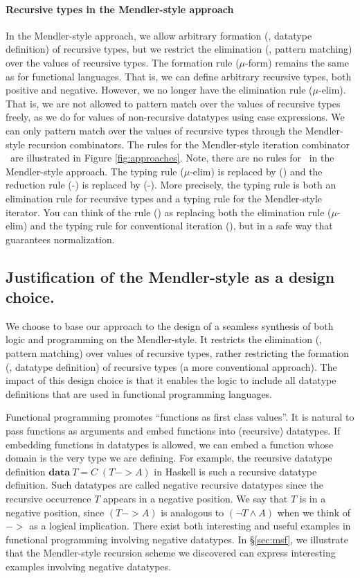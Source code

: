\paragraph{Recursive types in the Mendler-style approach}
In the Mendler-style approach, we allow arbitrary formation
(\ie, datatype definition) of recursive types, but we restrict
the elimination (\ie, pattern matching) over the values of recursive types. 
The formation rule {\small($\mu$-form)} remains the same as
for functional languages. That is, we can define arbitrary recursive types,
both positive and negative. However, we no longer have the elimination
rule {\small($\mu$-elim)}. That is, we are not allowed to pattern match over
the values of recursive types freely, as we do for values of non-recursive
datatypes using case expressions. We can only pattern match over
the values of recursive types through the Mendler-style recursion
combinators. The rules for the Mendler-style iteration combinator \MIt\
are illustrated in Figure \ref{fig:approaches}.
Note, there are no rules for \unIn\ in the Mendler-style approach.
The typing rule {\small($\mu$-elim)} is replaced by {\small(\MIt)} and
the reduction rule {\small(\unIn-\In)} is replaced by {\small(\MIt-\In)}.
More precisely, the typing rule {\small \MIt} is both an elimination rule
for recursive types and a typing rule for the Mendler-style iterator.
You can think of the rule {\small(\MIt)} as replacing both the elimination rule
{\small($\mu$-elim)} and the typing rule for conventional iteration
{\small(\It)}, but in a safe way that guarantees normalization.

\subsection{Justification of the Mendler-style as a design choice.}
\label{sec:intro:concepts:mendler}
We choose to base our approach to the design of a seamless synthesis of both
logic and programming on the Mendler-style. It restricts the elimination (\ie,
pattern matching) over values of recursive types, rather restricting the
formation (\ie, datatype definition) of recursive types (a more conventional
approach). The impact of this design choice is that it enables the logic to
include all datatype definitions that are used in functional programming
languages.

Functional programming promotes ``functions as first class values''.
It is natural to pass functions as arguments and embed functions into
(recursive) datatypes. If embedding functions in datatypes is allowed,
we can embed a function whose domain is the very type we are defining.
For example, the recursive datatype definition
$\mathbf{data}~T = C\;(T -> \textit{A})$ in Haskell is such a recursive
datatype definition. Such datatypes are called negative recursive datatypes
since the recursive occurrence $T$ appears in a negative position.
We say that $T$ is in a negative position, since $(T -> A)$ is analogous to
$(\neg T \land A)$ when we think of $->$ as a logical implication. There exist
both interesting and useful examples in functional programming involving
negative datatypes. In \S\ref{sec:msf}, we illustrate that
the Mendler-style recursion scheme we discovered can express
interesting examples involving negative datatypes.

